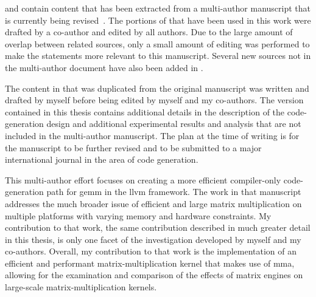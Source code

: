 \documentclass[\main/thesis.tex]{subfiles}
\begin{document}
\begin{preface}

 and  contain content that has been extracted from a multi-author manuscript that is currently being revised~\autocite{kuzma2021fast}.
The portions of  that have been used in this work were drafted by a co-author and edited by all authors.
Due to the large amount of overlap between related sources, only a small amount of editing was performed to make the statements more relevant to this manuscript.
Several new sources not in the multi-author document have also been added in .

The content in  that was duplicated from the original manuscript was written and drafted by myself before being edited by myself and my co-authors.
The version contained in this thesis contains additional details in the description of the code-generation design and additional experimental results and analysis that are not included in the multi-author manuscript.
The plan at the time of writing is for the manuscript to be further revised and to be submitted to a major international journal in the area of code generation.

This multi-author effort focuses on creating a more efficient compiler-only code-generation path for \gls{gemm} in the \gls{llvm} framework.
The work in that manuscript addresses the much broader issue of efficient and large matrix multiplication on multiple platforms with varying memory and hardware constraints.
My contribution to that work, the same contribution described in much greater detail in this thesis, is only one facet of the investigation developed by myself and my co-authors.
Overall, my contribution to that work is the implementation of an efficient and performant matrix-multiplication kernel that makes use of \gls{mma}, allowing for the examination and comparison of the effects of \glspl{matrix engine} on large-scale matrix-multiplication kernels.

%
%
\end{preface}
\end{document}
